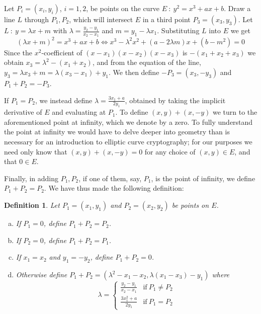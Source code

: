 \documentclass[a4paper,12pt]{article}
\newtheorem*{mydef}{Definition}
\begin{document}
Let $P_i = (x_i,y_i)$, $i=1,2$, be points on the curve $E\ :\ y^2 = x^3+ax+b$. Draw a line $L$ through $P_1,P_2$, which will intersect $E$ in a third point $P_3 = (x_3,y_3)$. Let $L\ :\ y=\lambda x+m$ with $\lambda = \frac{y_2-y_1}{x_2-x_1}$ and $m = y_1-\lambda x_1$. Substituting $L$ into $E$ we get
\begin{equation}
(\lambda x+m)^2 = x^3+ax+b \Leftrightarrow x^3-\lambda^2 x^2+(a-2\lambda m)x+(b-m^2)=0
\end{equation}
Since the $x^2$-coefficient of $(x-x_1)(x-x_2)(x-x_3)$ is $-(x_1+x_2+x_3)$ we obtain $x_3 = \lambda^2-(x_1+x_2)$, and from the equation of the line, $y_3 = \lambda x_3+m = \lambda (x_3-x_1)+y_1$. We then define $-P_3 = (x_3,-y_3)$ and $P_1+P_2=-P_3$.

If $P_1=P_2$, we instead define $\lambda = \frac{3x_1+a}{2y_1}$, obtained by taking the implicit derivative of $E$ and evaluating at $P_1$. To define $(x,y)+(x,-y)$ we turn to the aforementioned point at infinity, which we denote by a zero. To fully understand the point at infinity we would have to delve deeper into geometry than is necessary for an introduction to elliptic curve cryptography; for our purposes we need only know that $(x,y)+(x,-y)=0$ for any choice of $(x,y) \in E$, and that $0 \in E$.

Finally, in adding $P_1,P_2$, if one of them, say, $P_1$, is the point of infinity, we define $P_1+P_2=P_2$. We have thus made the following definition: \cite[p. 285]{hoffstein}

\begin{mydef}
Let $P_1=(x_1,y_1)$ and $P_2=(x_2,y_2)$ be points on $E$.
\begin{enumerate}[a)]
\item If $P_1 = 0$, define $P_1+P_2=P_2$.

\item If $P_2=0$, define $P_1+P_2=P_1$.

\item If $x_1=x_2$ and $y_1=-y_2$, define $P_1+P_2=0$.

\item Otherwise define $P_1+P_2 = (\lambda^2-x_1-x_2,\lambda(x_1-x_3)-y_1)$ where
\begin{equation}
\lambda =
\begin{cases}
\frac{y_2-y_1}{x_2-x_1} & \text{if}\ P_1 \neq P_2 \\
\frac{3x_1^2+a}{2y_1} & \text{if}\ P_1 = P_2
\end{cases}
\end{equation}
\end{enumerate}
\end{mydef}
\end{document}
